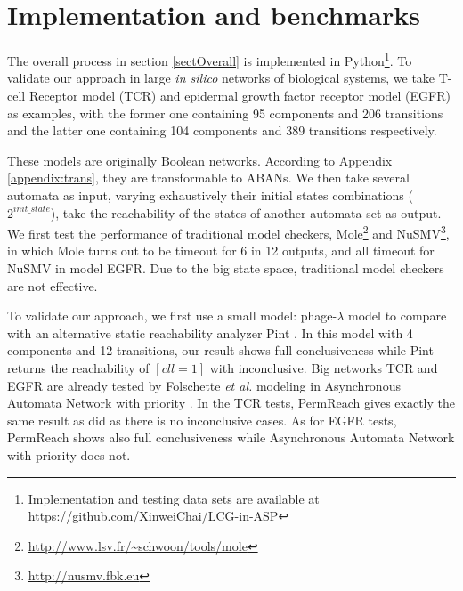 \documentclass[runningheads]{llncs}
\begin{document}

\section{Implementation and benchmarks}\label{sect:5}
The overall process in section \ref{sectOverall} is implemented in Python\footnote{Implementation and testing data sets are available at \url{https://github.com/XinweiChai/LCG-in-ASP}}. 
To validate our approach in large \textit{in silico} networks of biological systems, we take T-cell Receptor model (TCR) \cite{saez2007logical} and epidermal growth factor receptor model (EGFR) \cite{samaga2009logic} as examples, with the former one containing 95 components and 206 transitions and the latter one containing 104 components and 389 transitions respectively. 

These models are originally Boolean networks.
According to Appendix \ref{appendix:trans}, they are transformable to ABANs. We then take several automata as input, varying exhaustively their initial states combinations ($2^{init\_state}$), take the reachability of the states of another automata set as output.
We first test the performance of traditional model checkers, Mole\footnote{\url{http://www.lsv.fr/~schwoon/tools/mole}} and NuSMV\footnote{\url{http://nusmv.fbk.eu}}, in which Mole turns out to be timeout for 6 in 12 outputs, and all timeout for NuSMV in model EGFR.
Due to the big state space, traditional model checkers are not effective. 

To validate our approach, we first use a small model: phage-$\lambda$ model \cite{thieffry1995dynamical} to compare with an alternative static reachability analyzer Pint \cite{pauleve2012}. In this model with 4 components and 12 transitions, our result shows full conclusiveness while Pint returns the reachability of $[cll=1]$ with inconclusive.
Big networks TCR and EGFR are already tested by Folschette \textit{et al.} modeling in Asynchronous Automata Network with priority \cite{folschette2015}. 
In the TCR tests, PermReach gives exactly the same result as \cite{folschette2015} did as there is no inconclusive cases. As for EGFR tests, PermReach shows also full conclusiveness while Asynchronous Automata Network with priority does not.
\end{document}
